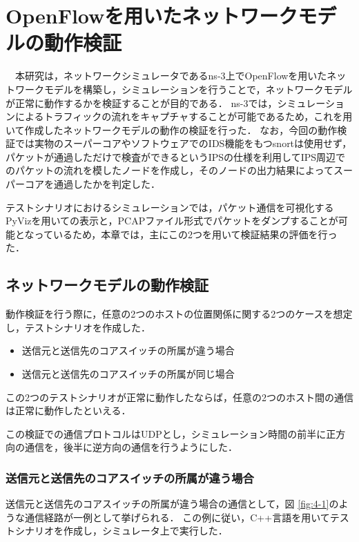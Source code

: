 \chapter{OpenFlowを用いたネットワークモデルの動作検証}

　本研究は，ネットワークシミュレータであるns-3上でOpenFlowを用いたネットワークモデルを構築し，シミュレーションを行うことで，ネットワークモデルが正常に動作するかを検証することが目的である．
ns-3では，シミュレーションによるトラフィックの流れをキャプチャすることが可能であるため，これを用いて作成したネットワークモデルの動作の検証を行った．
なお，今回の動作検証では実物のスーパーコアやソフトウェアでのIDS機能をもつsnortは使用せず，パケットが通過しただけで検査ができるというIPSの仕様を利用してIPS周辺でのパケットの流れを模したノードを作成し，そのノードの出力結果によってスーパーコアを通過したかを判定した．

テストシナリオにおけるシミュレーションでは，パケット通信を可視化するPyVizを用いての表示と，PCAPファイル形式でパケットをダンプすることが可能となっているため，本章では，主にこの2つを用いて検証結果の評価を行った．

\section{ネットワークモデルの動作検証}

動作検証を行う際に，任意の2つのホストの位置関係に関する2つのケースを想定し，テストシナリオを作成した．

\begin{itemize}
	\item 送信元と送信先のコアスイッチの所属が違う場合
	\item 送信元と送信先のコアスイッチの所属が同じ場合
\end{itemize}

この2つのテストシナリオが正常に動作したならば，任意の2つのホスト間の通信は正常に動作したといえる．

この検証での通信プロトコルはUDPとし，シミュレーション時間の前半に正方向の通信を，後半に逆方向の通信を行うようにした．

\subsection{送信元と送信先のコアスイッチの所属が違う場合}

送信元と送信先のコアスイッチの所属が違う場合の通信として，図 \ref{fig:4-1}のような通信経路が一例として挙げられる．
この例に従い，C++言語を用いてテストシナリオを作成し，シミュレータ上で実行した．

